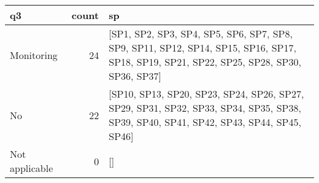 \begin{tabular}{lrl}
\toprule
             q3 &  count &                                                                                                                                       sp \\
\midrule
     Monitoring &     24 &  [SP1, SP2, SP3, SP4, SP5, SP6, SP7, SP8, SP9, SP11, SP12, SP14, SP15, SP16, SP17, SP18, SP19, SP21, SP22, SP25, SP28, SP30, SP36, SP37] \\
             No &     22 &     [SP10, SP13, SP20, SP23, SP24, SP26, SP27, SP29, SP31, SP32, SP33, SP34, SP35, SP38, SP39, SP40, SP41, SP42, SP43, SP44, SP45, SP46] \\
 Not applicable &      0 &                                                                                                                                       [] \\
\bottomrule
\end{tabular}
